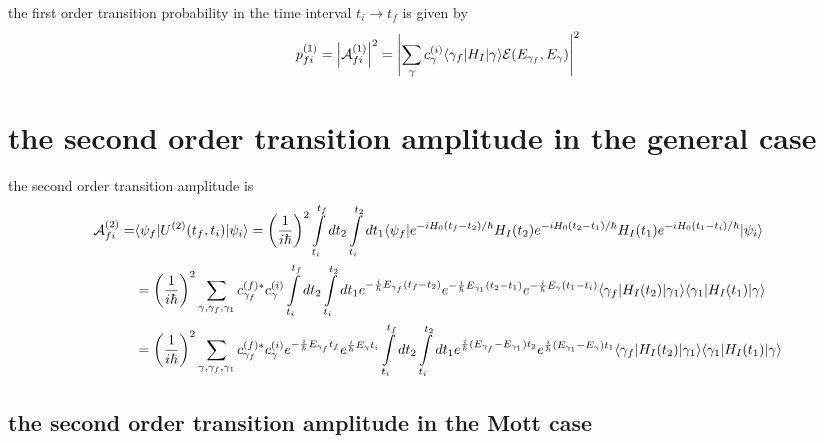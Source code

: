 the first order transition probability in the time interval $t_i\rightarrow t_f$ is given by
\begin{align}
  p_{fi}^{(1)} = \left| \mathcal{A}_{fi}^{(1)} \right|^2 = \left|\sum_\gamma {c_\gamma^{(i)}}\langle \gamma_f|H_I|\gamma\rangle   {\cal E}(E_{\gamma_f},E_{\gamma})\right|^2
\end{align}
\newpage
\section{the second order transition amplitude in the general case}
the second order transition amplitude is
\begin{align}
  {\cal A}_{fi}^{(2)} = & \langle \psi_f | U^{(2)}(t_f,t_i) | \psi_i \rangle = \left(\frac{1}{i\hbar}\right)^2 \int\limits_{t_i}^{t_f}dt_2 \int\limits_{t_i}^{t_2}dt_1 \langle \psi_f | e^{-iH_0(t_f-t_2)/\hbar} H_I(t_2) e^{-iH_0(t_2-t_1)/\hbar} H_I(t_1) e^{-iH_0(t_1-t_i)/\hbar} | \psi_i \rangle\nonumber                                                                                                                        \\
  & = \left(\frac{1}{i\hbar}\right)^2 \sum\limits_{\gamma,\gamma_f,\gamma_1}c_{\gamma_f}^{(f)*} c_{\gamma}^{(i)}\int\limits_{t_i}^{t_f}dt_2\int\limits_{t_i}^{t_2}dt_1e^{-\frac{i}{\hbar}E_{\gamma_f} (t_f-t_2)}e^{-\frac{i}{\hbar}E_{\gamma_1}(t_2-t_1)}e^{-\frac{i}{\hbar}E_{\gamma}(t_1-t_i)}\langle \gamma_f |H_I(t_2)| \gamma_1\rangle\langle \gamma_1 |H_I(t_1)| \gamma\rangle\nonumber                                  \\
  & =\left(\frac{1}{i\hbar}\right)^2 \sum\limits_{\gamma,\gamma_f,\gamma_1}c_{\gamma_f}^{(f)*} c_{\gamma}^{(i)}e^{-\frac{i}{\hbar}E_{\gamma_f} t_f}e^{\frac{i}{\hbar}E_{\gamma} t_i}\int\limits_{t_i}^{t_f}dt_2\int\limits_{t_i}^{t_2}dt_1e^{\frac{i}{\hbar}(E_{\gamma_f}-E_{\gamma_1})t_2}e^{\frac{i}{\hbar}(E_{\gamma_1}-E_{\gamma})t_1}\langle \gamma_f |H_I(t_2)| \gamma_1\rangle\langle \gamma_1 |H_I(t_1)| \gamma\rangle
\end{align}

\subsection{the second order transition amplitude in the Mott case}

